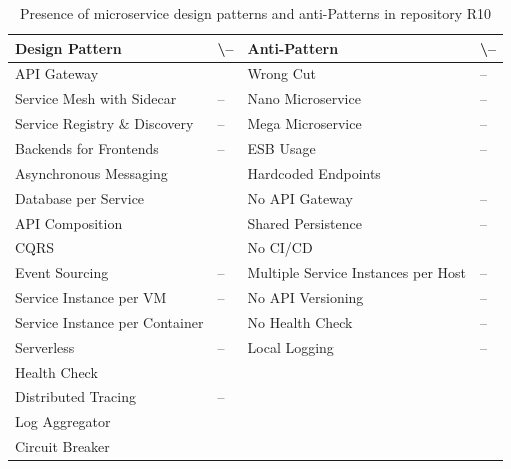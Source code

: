 \documentclass{Configuration_Files/PoliMi3i_thesis}
\newcommand{\cmark}{\ding{51}}%
\begin{document}
\begin{table}[H]
\centering 
    \begin{tabular}{ 
  | >{\centering\arraybackslash} m{16em} 
  | >{\centering\arraybackslash} m{2.2em} 
  | >{\centering\arraybackslash} m{16em} 
  | >{\centering\arraybackslash} m{2.2em} | }
    \hline
    \rowcolor{bluepoli!40}
    \textbf{Design Pattern} & \cmark \textbackslash – & \textbf{Anti-Pattern} & \cmark \textbackslash – \T\B \\
    \hline \hline
    API Gateway & \cmark & Wrong Cut & – \T\B\\
    \hline
    \rowcolor{bluepoli!10}
    Service Mesh with Sidecar & – & Nano Microservice & – \T\B \\
    \hline
    Service Registry \& Discovery & – & Mega Microservice & – \T\B \\
    \hline
    \rowcolor{bluepoli!10}
    Backends for Frontends & – & ESB Usage & – \T\B \\
    \hline
    Asynchronous Messaging & \cmark & Hardcoded Endpoints & \cmark \T\B \\
    \hline
    \rowcolor{bluepoli!10}
    Database per Service & \cmark & No API Gateway & – \T\B \\
    \hline
    API Composition & \cmark & Shared Persistence & – \T\B \\
    \hline
    \rowcolor{bluepoli!10}
    CQRS & \cmark & No CI/CD & \cmark \T\B \\
    \hline
    Event Sourcing & – & Multiple Service Instances per Host & – \T\B \\
    \hline
    \rowcolor{bluepoli!10}
    Service Instance per VM & – & No API Versioning & – \T\B \\
    \hline
    Service Instance per Container & \cmark & No Health Check & – \T\B \\
    \hline
    \rowcolor{bluepoli!10}
    Serverless & – & Local Logging & – \T\B \\
    \hline
    Health Check & \cmark &  & \T\B \\
    \hline
    \rowcolor{bluepoli!10}
    Distributed Tracing & – & & \T\B \\
    \hline
    Log Aggregator & \cmark &  & \T\B \\
    \hline
    \rowcolor{bluepoli!10}
    Circuit Breaker & \cmark &  & \T\B \\
    \hline
    \end{tabular}
    \\[10pt]
    \caption{Presence of microservice design patterns and anti-Patterns in repository R10}
    \label{table:R10_result}
\end{table}
\end{document}
